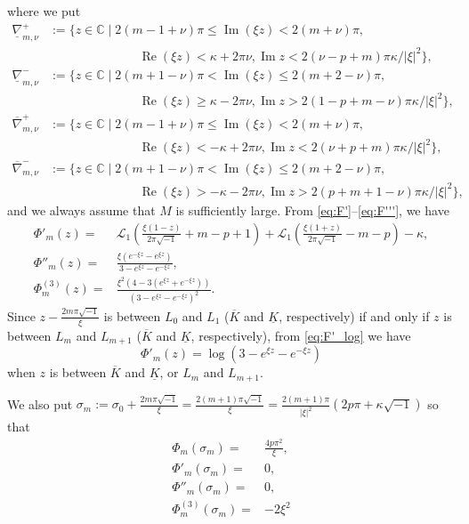 \documentclass[a4paper,dvipdfmx]{amsart}
\theoremstyle{plain}
\theoremstyle{definition}
\theoremstyle{remark}
\newcommand{\C}{\mathbb{C}}
\renewcommand{\L}{\mathcal{L}}
\renewcommand{\Re}{\operatorname{Re}}
\renewcommand{\Im}{\operatorname{Im}}
\renewcommand{\i}{\sqrt{-1}}
\newcommand{\saddle}{\sigma}
\numberwithin{equation}{section}
\begin{document}
where we put
\begin{align*}
  \underline{\nabla}^{+}_{m,\nu}
  &:=
  \{z\in\C\mid2(m-1+\nu)\pi\le\Im(\xi z)<2(m+\nu)\pi,
  \\
  &\qquad\qquad\phantom{z\in\C\mid}
  \Re(\xi z)<\kappa+2\pi\nu,
  \Im{z}<2(\nu-p+m)\pi\kappa/|\xi|^2\},
  \\
  \underline{\nabla}^{-}_{m,\nu}
  &:=
  \{z\in\C\mid2(m+1-\nu)\pi<\Im(\xi z)\le2(m+2-\nu)\pi,
  \\
  &\qquad\qquad\phantom{z\in\C\mid}
  \Re(\xi z)\ge\kappa-2\pi\nu,
  \Im{z}>2(1-p+m-\nu)\pi\kappa/|\xi|^2\},
  \\
  \overline{\nabla}^{+}_{m,\nu}
  &:=
  \{z\in\C\mid2(m-1+\nu)\pi\le\Im(\xi z)<2(m+\nu)\pi,
  \\
  &\qquad\qquad\phantom{z\in\C\mid}
  \Re(\xi z)<-\kappa+2\pi\nu,
  \Im{z}<2(\nu+p+m)\pi\kappa/|\xi|^2\},
  \\
  \overline{\nabla}^{-}_{m,\nu}
  &:=
  \{z\in\C\mid2(m+1-\nu)\pi<\Im(\xi z)\le2(m+2-\nu)\pi,
  \\
  &\qquad\qquad\phantom{z\in\C\mid}
  \Re(\xi z)>-\kappa-2\pi\nu,
  \Im{z}>2(p+m+1-\nu)\pi\kappa/|\xi|^2\},
\end{align*}
and we always assume that $M$ is sufficiently large.
From \eqref{eq:F'}--\eqref{eq:F'''}, we have
\begin{align}
  \Phi'_{m}(z)
  =&
  \L_1\left(\frac{\xi(1-z)}{2\pi\i}+m-p+1\right)
  +
  \L_1\left(\frac{\xi(1+z)}{2\pi\i}-m-p\right)
  -\kappa,
  \label{eq:Phi'}
  \\
  \Phi''_{m}(z)
  =&
  \frac{\xi\left(e^{-\xi z}-e^{\xi z}\right)}{3-e^{\xi z}-e^{-\xi z}},
  \label{eq:Phi''}
  \\
  \Phi^{(3)}_{m}(z)
  =&
  \frac{\xi^2(4-3(e^{\xi z}+e^{-\xi z}))}{(3-e^{\xi z}-e^{-\xi z})^2}.
  \label{eq:Phi'''}
\end{align}
Since $z-\frac{2m\pi\i}{\xi}$ is between $L_0$ and $L_1$ ($\overline{K}$ and $\underline{K}$, respectively) if and only if $z$ is between $L_m$ and $L_{m+1}$ ($\overline{K}$ and $\underline{K}$, respectively), from \eqref{eq:F'_log} we have
\begin{equation}\label{eq:Phi'_log}
  \Phi'_{m}(z)
  =
  \log\left(3-e^{\xi z}-e^{-\xi z}\right)
\end{equation}
when $z$ is between $\overline{K}$ and $\underline{K}$, or $L_{m}$ and $L_{m+1}$.
\par
We also put $\saddle_m:=\saddle_0+\frac{2m\pi\i}{\xi}=\frac{2(m+1)\pi\i}{\xi}=\frac{2(m+1)\pi}{|\xi|^2}(2p\pi+\kappa\i)$ so that
\begin{equation}\label{eq:Phi_derivatives}
\begin{split}
  \Phi_m(\saddle_{m})
  =&
  \frac{4p\pi^2}{\xi},
  \\
  \Phi'_m(\saddle_{m})
  =&0,
  \\
  \Phi''_m(\saddle_{m})
  =&
  0,
  \\
  \Phi^{(3)}_m(\saddle_{m})
  =&
  -2\xi^2
\end{split}
\end{equation}
\end{document}
